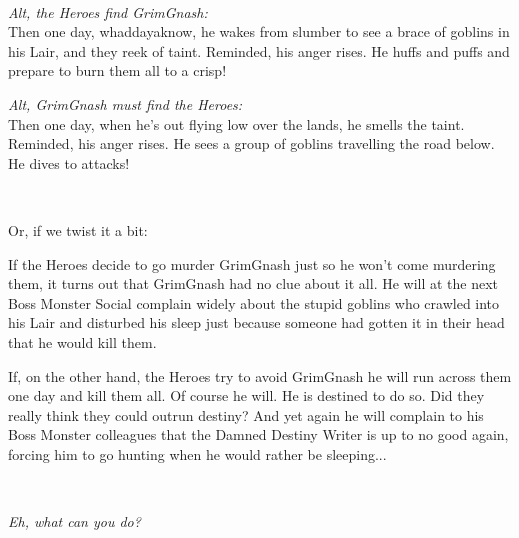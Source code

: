 \

\begin{center}
\begin{minipage}[t]{0.48\textwidth}                   %
    \emph{Alt, the Heroes find GrimGnash:}\\
    Then one day, whaddayaknow, he wakes from slumber to see a brace of goblins in his Lair, and they reek of taint. Reminded, his anger rises. He huffs and puffs and prepare to burn them all to a crisp!
\end{minipage}
\hfill
\begin{minipage}[t]{0.48\textwidth}                   %
    \emph{Alt, GrimGnash must find the Heroes:}\\
    Then one day, when he's out flying low over the lands, he smells the taint. Reminded, his anger rises. He sees a group of goblins travelling the road below. He dives to attacks!
\end{minipage}
\end{center}

\

\noindent Or, if we twist it a bit:

If the Heroes decide to go murder GrimGnash just so he won't come murdering them, it turns out that GrimGnash had no clue about it all. He will at the next Boss Monster Social complain widely about the stupid goblins who crawled into his Lair and disturbed his sleep just because someone had gotten it in their head that he would kill them.

If, on the other hand, the Heroes try to avoid GrimGnash he will run across them one day and kill them all. Of course he will. He is destined to do so. Did they really think they could outrun destiny? And yet again he will complain to his Boss Monster colleagues that the Damned Destiny Writer is up to no good again, forcing him to go hunting when he would rather be sleeping...

\

\noindent \emph{Eh, what can you do?} 



















